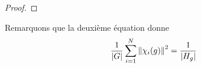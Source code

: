 \ifdefined\outputproof
\begin{proof}

\end{proof}
\fi

Remarquons que la deuxième équation donne
\begin{equation}
	\frac{1}{|G|} \sum_{i = 1}^{N} \norm{\chi_{i}(g)}^{2} =
	\frac{1}{|H_{g}|}
\end{equation}
